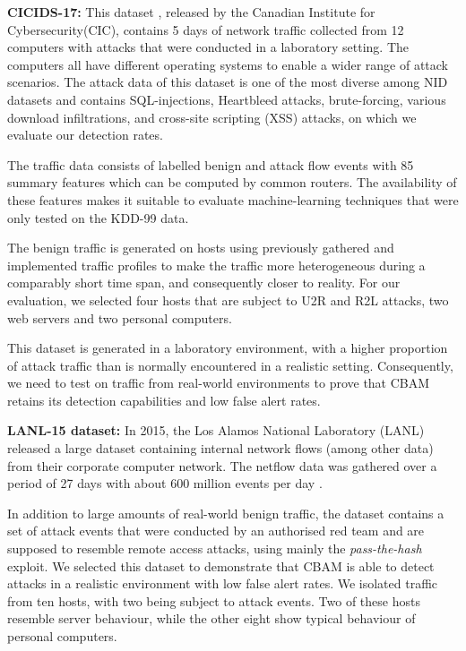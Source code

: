 \textbf{CICIDS-17:}
This dataset \cite{sharafaldin2018toward}, released by the Canadian  Institute  for  Cybersecurity(CIC), contains 5 days of network traffic collected from 12 computers with attacks that were conducted in a laboratory setting. The computers all have different operating systems to enable a wider range of attack scenarios. The  attack  data  of  this  dataset  is  one  of  the  most  diverse  among  NID  datasets and contains SQL-injections, Heartbleed attacks, brute-forcing, various download infiltrations, and cross-site scripting (XSS) attacks, on which we evaluate our detection rates.

The traffic data consists of labelled benign and attack flow events with 85 summary features which can be computed by common routers. The availability of these features makes it suitable to evaluate machine-learning techniques that were only tested on the KDD-99 data.

The benign traffic is generated on hosts using previously gathered and implemented traffic profiles to make the traffic more heterogeneous during a comparably short time span, and consequently closer to reality. For our evaluation, we selected four hosts that are subject to U2R and R2L attacks, two web servers and two personal computers. 

This dataset is generated in a laboratory environment, with a higher proportion of attack traffic than is normally encountered in a realistic setting. Consequently, we need to test on traffic from real-world environments to prove that CBAM retains its detection capabilities and low false alert rates. 

\textbf{LANL-15 dataset:}
In 2015, the Los Alamos National Laboratory (LANL)  released a large dataset containing internal network flows (among other data) from their corporate computer network. The netflow data was gathered over a period of 27 days with about 600 million events per day \cite{akent-2015-enterprise-data,kent-2015-cyberdata1}.

In addition to large amounts of real-world benign traffic, the dataset contains a set of attack events that were conducted by an authorised red team and are supposed to resemble remote access attacks, using mainly the \emph{pass-the-hash} exploit. We selected this dataset to demonstrate that CBAM is able to detect attacks in a realistic environment with low false alert rates. We isolated traffic from ten hosts, with two being subject to attack events. Two of these hosts resemble server behaviour, while the other eight show typical behaviour of personal computers.

